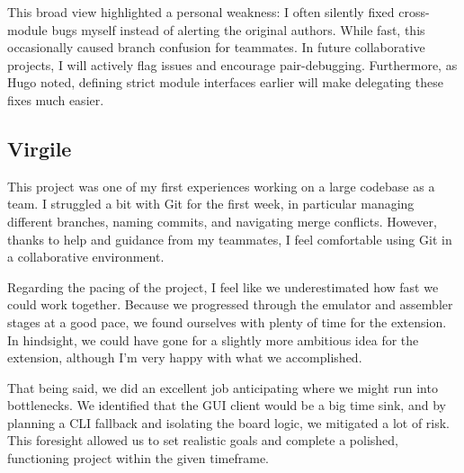 \documentclass[11pt]{article}
\begin{document}
This broad view highlighted a personal weakness: I often silently fixed cross-module bugs myself instead of alerting the original authors. While fast, this occasionally caused branch confusion for teammates. In future collaborative projects, I will actively flag issues and encourage pair-debugging. Furthermore, as Hugo noted, defining strict module interfaces earlier will make delegating these fixes much easier.

\subsection{Virgile}

This project was one of my first experiences working on a large codebase as a team. I struggled a bit with Git for the first week, in particular managing different branches, naming commits, and navigating merge conflicts. However, thanks to help and guidance from my teammates, I feel comfortable using Git in a collaborative environment.

Regarding the pacing of the project, I feel like we underestimated how fast we could work together. Because we progressed through the emulator and assembler stages at a good pace, we found ourselves with plenty of time for the extension. In hindsight, we could have gone for a slightly more ambitious idea for the extension, although I'm very happy with what we accomplished.

That being said, we did an excellent job anticipating where we might run into bottlenecks. We identified that the GUI client would be a big time sink, and by planning a CLI fallback and isolating the board logic, we mitigated a lot of risk. This foresight allowed us to set realistic goals and complete a polished, functioning project within the given timeframe.
\end{document}

